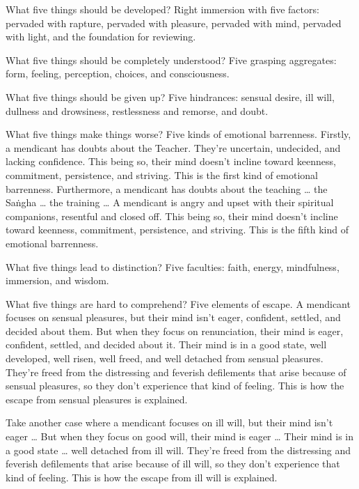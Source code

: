\documentclass[12pt,openany]{book}%
\begin{document}
What five things should be developed? Right immersion with five factors: pervaded with rapture, pervaded with pleasure, pervaded with mind, pervaded with light, and the foundation for reviewing. 

What five things should be completely understood? Five grasping aggregates: form, feeling, perception, choices, and consciousness. 

What five things should be given up? Five hindrances: sensual desire, ill will, dullness and drowsiness, restlessness and remorse, and doubt. 

What five things make things worse? Five kinds of emotional barrenness. Firstly, a mendicant has doubts about the Teacher. They’re uncertain, undecided, and lacking confidence. This being so, their mind doesn’t incline toward keenness, commitment, persistence, and striving. This is the first kind of emotional barrenness. Furthermore, a mendicant has doubts about the teaching … the \textsanskrit{Saṅgha} … the training … A mendicant is angry and upset with their spiritual companions, resentful and closed off. This being so, their mind doesn’t incline toward keenness, commitment, persistence, and striving. This is the fifth kind of emotional barrenness. 

What five things lead to distinction? Five faculties: faith, energy, mindfulness, immersion, and wisdom. 

What five things are hard to comprehend? Five elements of escape. A mendicant focuses on sensual pleasures, but their mind isn’t eager, confident, settled, and decided about them. But when they focus on renunciation, their mind is eager, confident, settled, and decided about it. Their mind is in a good state, well developed, well risen, well freed, and well detached from sensual pleasures. They’re freed from the distressing and feverish defilements that arise because of sensual pleasures, so they don’t experience that kind of feeling. This is how the escape from sensual pleasures is explained. 

Take another case where a mendicant focuses on ill will, but their mind isn’t eager … But when they focus on good will, their mind is eager … Their mind is in a good state … well detached from ill will. They’re freed from the distressing and feverish defilements that arise because of ill will, so they don’t experience that kind of feeling. This is how the escape from ill will is explained. 
\end{document}
